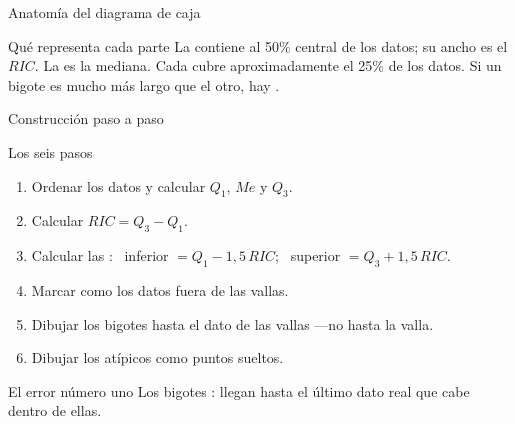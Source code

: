 \documentclass[aspectratio=169,10pt]{beamer}
\newcommand{\cajahor}[8]{%
  \draw[#8,thick] (#2*#1,#7) -- (#3*#1,#7);
  \draw[#8,thick] (#5*#1,#7) -- (#6*#1,#7);
  \draw[#8,thick] (#2*#1,#7-0.16) -- (#2*#1,#7+0.16);
  \draw[#8,thick] (#6*#1,#7-0.16) -- (#6*#1,#7+0.16);
  \draw[#8,thick,fill=#8!18] (#3*#1,#7-0.28) rectangle (#5*#1,#7+0.28);
  \draw[#8,very thick] (#4*#1,#7-0.28) -- (#4*#1,#7+0.28);
}
\begin{document}
\begin{frame}{Anatomía del diagrama de caja}
  \centering

  \vspace{0.35cm}
  \begin{alertblock}{Qué representa cada parte}
    \scriptsize
    La  contiene al 50\% central de los datos; su ancho es el
    $RIC$. La  es la mediana. Cada 
    cubre aproximadamente el 25\% de los datos. Si un bigote es mucho más
    largo que el otro, hay .
  \end{alertblock}
\end{frame}

\begin{frame}{Construcción paso a paso}
  \footnotesize
  \begin{block}{Los seis pasos}
    \tiny
    \begin{enumerate}\setlength{\itemsep}{-0.03cm}
      \item Ordenar los datos y calcular $Q_1$, $Me$ y $Q_3$.
      \item Calcular $RIC = Q_3 - Q_1$.
      \item Calcular las : \ inferior $= Q_1 - 1{,}5\,RIC$; \
            superior $= Q_3 + 1{,}5\,RIC$.
      \item Marcar como  los datos fuera de las vallas.
      \item Dibujar los bigotes hasta el dato \azul{más extremo que aún esté
            dentro} de las vallas —no hasta la valla.
      \item Dibujar los atípicos como puntos sueltos.
    \end{enumerate}
  \end{block}

  \vspace{0.05cm}
  \begin{alertblock}{El error número uno}
    \tiny
    Los bigotes : llegan hasta el último
    dato real que cabe dentro de ellas.
  \end{alertblock}
\end{frame}
\end{document}
